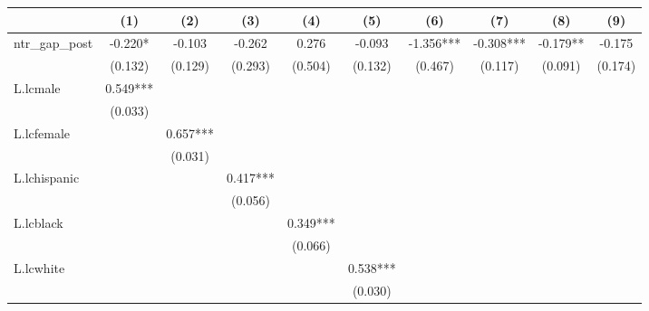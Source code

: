 {
\def\sym#1{\ifmmode^{#1}\else\(^{#1}\)\fi}
\begin{tabular}{l*{9}{c}}
\toprule
                    &\multicolumn{1}{c}{(1)}   &\multicolumn{1}{c}{(2)}   &\multicolumn{1}{c}{(3)}   &\multicolumn{1}{c}{(4)}   &\multicolumn{1}{c}{(5)}   &\multicolumn{1}{c}{(6)}   &\multicolumn{1}{c}{(7)}   &\multicolumn{1}{c}{(8)}   &\multicolumn{1}{c}{(9)}   \\
\midrule
ntr\_gap\_post        &   -0.220*  &   -0.103   &   -0.262   &    0.276   &   -0.093   &   -1.356***&   -0.308***&   -0.179** &   -0.175   \\
                    &  (0.132)   &  (0.129)   &  (0.293)   &  (0.504)   &  (0.132)   &  (0.467)   &  (0.117)   &  (0.091)   &  (0.174)   \\
\addlinespace
L.lcmale            &    0.549***&            &            &            &            &            &            &            &            \\
                    &  (0.033)   &            &            &            &            &            &            &            &            \\
\addlinespace
L.lcfemale          &            &    0.657***&            &            &            &            &            &            &            \\
                    &            &  (0.031)   &            &            &            &            &            &            &            \\
\addlinespace
L.lchispanic        &            &            &    0.417***&            &            &            &            &            &            \\
                    &            &            &  (0.056)   &            &            &            &            &            &            \\
\addlinespace
L.lcblack           &            &            &            &    0.349***&            &            &            &            &            \\
                    &            &            &            &  (0.066)   &            &            &            &            &            \\
\addlinespace
L.lcwhite           &            &            &            &            &    0.538***&            &            &            &            \\
                    &            &            &            &            &  (0.030)   &            &            &            &            \\

\end{tabular}}
